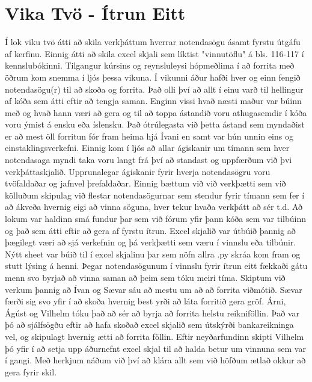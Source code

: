 \documentclass[a4paper,10pt]{article}
\begin{document}
\section{Vika Tvö - Ítrun Eitt}
Í lok viku tvö átti að skila verkþáttum hverrar notendasögu ásamt fyrstu útgáfu af kerfinu.  Einnig átti að skila excel skjali sem líktist "vinnutöflu" á bls. 116-117 í kennslubókinni.  Tilgangur kúrsins og reynsluleysi hópmeðlima í að forrita með öðrum kom snemma í ljós þessa vikuna.  Í vikunni áður hafði hver og einn fengið notendasögu(r) til að skoða og forrita.  Það olli því að allt í einu varð til hellingur af kóða sem átti eftir að tengja saman.  Enginn vissi hvað næsti maður var búinn með og hvað hann væri að gera og til að toppa ástandið voru athugasemdir í kóða voru ýmist á ensku eða íslensku.  Það ótrúlegasta við þetta ástand sem myndaðist er að mest öll forritun fór fram heima hjá Ívani en samt var hún unnin eins og einstaklingsverkefni.  Einnig kom í ljós að allar ágiskanir um tímann sem hver notendasaga myndi taka voru langt frá því að standast og uppfærðum við þvi verkþáttaskjalið.  Upprunalegar ágiskanir fyrir hverja notendasögru voru tvöfaldaðar og jafnvel þrefaldaðar.  Einnig bættum við við verkþætti sem við kölluðum skipulag við flestar notendasögurnar sem stendur fyrir tímann sem fer í að ákveða hvernig eigi að vinna söguna, hver tekur hvaða verkþátt að sér t.d.  
Að lokum var haldinn smá fundur þar sem við fórum yfir þann kóða sem var tilbúinn og það sem átti eftir að gera af fyrstu ítrun.  Excel skjalið var útbúið þannig að þægilegt væri að sjá verkefnin og þá verkþætti sem væru í vinnslu eða tilbúnir.  Nýtt sheet var búið til í excel skjalinu þar sem nöfn allra .py skráa kom fram og stutt lýsing á henni.  Þegar notendasögunum í vinnslu fyrir ítrun eitt fækkaði gátu menn svo byrjað að vinna saman að þeim sem tóku meiri tíma.
Skiptum við verkum þannig að Ívan og Sævar sáu að mestu um að að forrita viðmótið.  Sævar færði sig svo yfir í að skoða hvernig best yrði að láta forritið gera gröf.  Árni, Ágúst og Vilhelm tóku það að sér að byrja að forrita helstu reikniföllin.  Það var þó að sjálfsögðu eftir að hafa skoðað excel skjalið sem útskýrði bankareikninga vel, og skipulagt hvernig ætti að forrita föllin.  Eftir neyðarfundinn skipti Vilhelm þó yfir í að setja upp áðurnefnt excel skjal til að halda betur um vinnuna sem var í gangi.  
Með herkjum náðum við því að klára allt sem við höfðum ætlað okkur að gera fyrir skil. 
\end{document}
